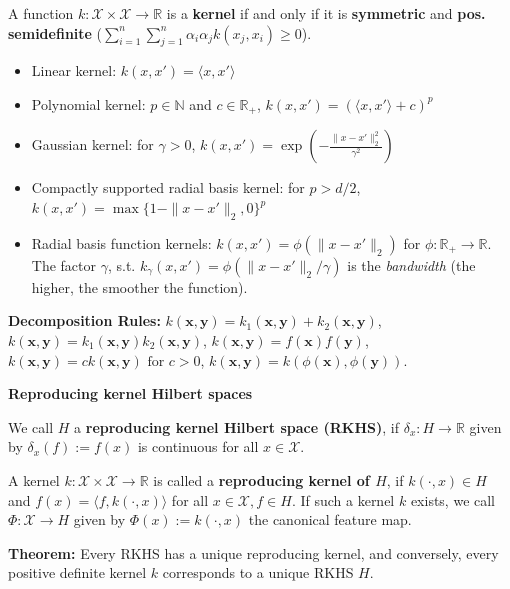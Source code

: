 \documentclass[a4paper,10pt]{article}
\newenvironment{myitemize}
{\vspace{-0.25cm}\begin{itemize}}
{\end{itemize}}
\newcommand{\subtitle}[1]{\begin{normalsize}\vspace{0.25cm}\textbf{#1} \end{normalsize}}
\begin{document}
\begin{small}
A function $k : \mathcal{X} \times \mathcal{X} \to \mathbb{R}$ is a \textbf{kernel} if and only if it is \textbf{symmetric} and \textbf{pos. semidefinite} ($ \sum_{i=1}^{n} \sum_{j=1}^{n} \alpha_i \alpha_j k(x_j, x_i) \geq 0$).

\begin{myitemize}
    \item Linear kernel: $k(x, x') = \langle x, x' \rangle$
    \item Polynomial kernel: $p \in \mathbb{N}$ and $c \in \mathbb{R}_+$, $k(x, x') = (\langle x, x' \rangle + c)^p$
    \item Gaussian kernel: for $\gamma > 0$, $k(x, x') = \exp\left(-\frac{\|x - x'\|_2^2}{\gamma^2}\right)$
    \item Compactly supported radial basis kernel: for $p > d/2$, $k(x, x') = \max\{1 - \|x - x'\|_2, 0\}^p$
    \item Radial basis function kernels: $k(x, x') = \phi(\|x - x'\|_2)$ for $\phi : \mathbb{R}_+ \to \mathbb{R}$. The factor $\gamma$, s.t. $k_\gamma(x, x') = \phi(\|x - x'\|_2/\gamma)$ is the \textit{bandwidth} (the higher, the smoother the function).
\end{myitemize} 

\textbf{Decomposition Rules:} 
$k(\mathbf{x}, \mathbf{y}) = k_1(\mathbf{x}, \mathbf{y}) + k_2(\mathbf{x}, \mathbf{y})$,
$k(\mathbf{x}, \mathbf{y}) = k_1(\mathbf{x}, \mathbf{y})k_2(\mathbf{x}, \mathbf{y})$,
$k(\mathbf{x}, \mathbf{y}) = f(\mathbf{x}) f(\mathbf{y})$,
$k(\mathbf{x}, \mathbf{y}) = c k(\mathbf{x}, \mathbf{y}) \text{ for } c > 0$,
$k(\mathbf{x}, \mathbf{y}) = k(\phi(\mathbf{x}), \phi(\mathbf{y}))$.

\subtitle{Reproducing kernel Hilbert spaces}

We call $H$ a \textbf{reproducing kernel Hilbert space (RKHS)}, if $\delta_x : H \to \mathbb{R}$ given by $\delta_x(f) := f(x)$ is continuous for all $x \in \mathcal{X}$. 

A kernel $k : \mathcal{X} \times \mathcal{X} \to \mathbb{R}$ is called a \textbf{reproducing kernel of $H$}, if $k(\cdot, x) \in H$ and $f(x) = \langle f, k(\cdot, x) \rangle$ for all $x \in \mathcal{X}, f \in H$. If such a kernel $k$ exists, we call $\Phi : \mathcal{X} \to H$ given by $\Phi(x) := k(\cdot, x)$ the canonical feature map.

\textbf{Theorem:} Every RKHS has a unique reproducing kernel, and conversely, every positive definite kernel $ k $ corresponds to a unique RKHS $ H $.


\end{small}
\end{document}
